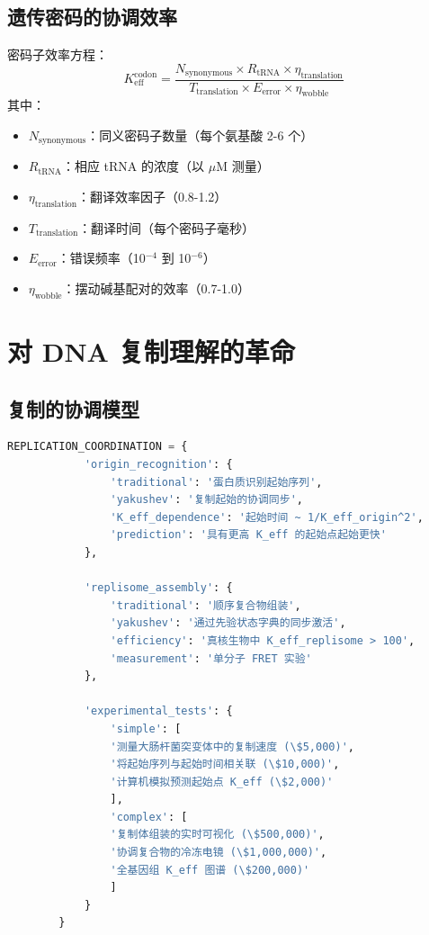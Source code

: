 \documentclass[12pt]{article}
\begin{document}
	\subsection{遗传密码的协调效率}
	
	密码子效率方程：
	\[
	K_{\text{eff}}^{\text{codon}} = \frac{N_{\text{synonymous}} \times R_{\text{tRNA}} \times \eta_{\text{translation}}}{T_{\text{translation}} \times E_{\text{error}} \times \eta_{\text{wobble}}}
	\]
	其中：
	\begin{itemize}
		\item $N_{\text{synonymous}}$：同义密码子数量（每个氨基酸 2-6 个）
		\item $R_{\text{tRNA}}$：相应 tRNA 的浓度（以 $\mu$M 测量）
		\item $\eta_{\text{translation}}$：翻译效率因子（0.8-1.2）
		\item $T_{\text{translation}}$：翻译时间（每个密码子毫秒）
		\item $E_{\text{error}}$：错误频率（10$^{-4}$ 到 10$^{-6}$）
		\item $\eta_{\text{wobble}}$：摆动碱基配对的效率（0.7-1.0）
	\end{itemize}
	
	\section{对 DNA 复制理解的革命}
	
	\subsection{复制的协调模型}
	
	\begin{lstlisting}[language=Python, caption={作为同步协调的复制}, label={lst:rep}, breaklines=true]
		REPLICATION_COORDINATION = {
			'origin_recognition': {
				'traditional': '蛋白质识别起始序列',
				'yakushev': '复制起始的协调同步',
				'K_eff_dependence': '起始时间 ~ 1/K_eff_origin^2',
				'prediction': '具有更高 K_eff 的起始点起始更快'
			},
			
			'replisome_assembly': {
				'traditional': '顺序复合物组装',
				'yakushev': '通过先验状态字典的同步激活',
				'efficiency': '真核生物中 K_eff_replisome > 100',
				'measurement': '单分子 FRET 实验'
			},
			
			'experimental_tests': {
				'simple': [
				'测量大肠杆菌突变体中的复制速度 (\$5,000)',
				'将起始序列与起始时间相关联 (\$10,000)',
				'计算机模拟预测起始点 K_eff (\$2,000)'
				],
				'complex': [
				'复制体组装的实时可视化 (\$500,000)',
				'协调复合物的冷冻电镜 (\$1,000,000)',
				'全基因组 K_eff 图谱 (\$200,000)'
				]
			}
		}
	\end{lstlisting}
	
\end{document}

